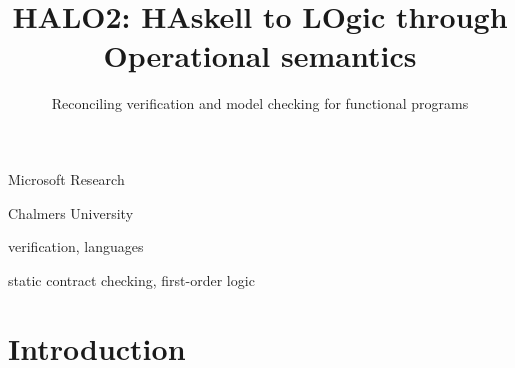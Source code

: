 \documentclass[preprint]{sigplanconf}
\begin{document}
\newcommand{\dlambda}{\mathsf{\lambda}}
\newcommand{\curry}{\mathsf{curry}}
\newcommand{\eval}{\mathsf{eval}}
\newcommand{\uncurry}{\mathsf{incurry}}
\newcommand{\dapp}{\mathsf{app}}

\newcommand{\injK}[2]{\mathsf{#1}(#2)}
\newcommand{\injKZ}[1]{\mathsf{#1}}
\newcommand{\injFun}[1]{\mathsf{Fun}(#1)}
\newcommand{\injBad}{\mathsf{Bad}}

\newcommand{\unitcpo}{{\sf{\bf 1}}}
\newcommand{\VarCpo}{\textit{Var}}
\newcommand{\FVarCpo}{\textit{FunVar}}
\newcommand{\interp}[3]{[\![#1]\!]_{\langle {#2},{#3}\rangle}}
\newcommand{\dbrace}[1]{[\![#1]\!]}
\newcommand{\linterp}[1]{{\cal I}(#1)}
\newcommand{\lassign}[1]{\mu(#1)}
\newcommand{\elab}[1]{\rightsquigarrow \formula{#1}}
\newcommand{\Fcf}{F_{\lcfZ}} 
\newcommand{\definable}[1]{{\mathop{def}}(#1)}
\newcommand{\curly}{\rightsquigarrow}
\newcommand{\Min}{\cal M}
\newcommand{\mlinterp}[1]{{\cal I}^{min}(#1)}

\renewcommand{\Th}{{\cal T}}

\newcommand{\theLang}{\lambda_{\sf HALO}}

\title{HALO2: HAskell to LOgic through Operational semantics}
\subtitle{Reconciling verification and model checking for functional programs}

           {Microsoft Research}{}

           {Chalmers University}{}
\maketitle
\makeatactive

\begin{abstract}
\end{abstract}


\terms
verification, languages

\keywords
static contract checking, first-order logic


\section{Introduction}\label{s:intro}
\end{document}

